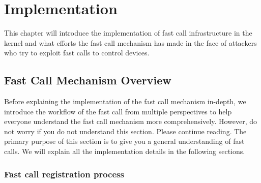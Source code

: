 \chapter{Implementation}
\label{sec:implementation}



This chapter will introduce the implementation of fast call infrastructure in the kernel and what efforts the fast call mechanism has 
made in the face of attackers who try to exploit fast calls to control devices.

\section{Fast Call Mechanism Overview}

Before explaining the implementation of the fast call mechanism in-depth, we introduce the workflow of the fast call from multiple perspectives 
to help everyone understand the fast call mechanism more comprehensively. However, do not worry if you do not understand this section. 
Please continue reading. The primary purpose of this section is to give you a general understanding of fast calls. 
We will explain all the implementation details in the following sections.

\subsection{Fast call registration process}

